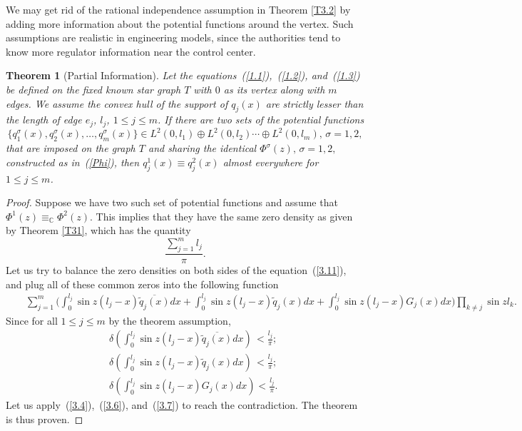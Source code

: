 \documentclass[10pt,a4paper]{article}
\theoremstyle{plain}
\newtheorem{theorem}{Theorem}[section]
\theoremstyle{definition}
\theoremstyle{remark}
\numberwithin{equation}{section}
\begin{document}
We may get rid of the rational independence assumption in Theorem \ref{T3.2} by adding more information about the potential functions around the vertex. Such assumptions are realistic in engineering models, since the authorities tend to know more regulator information near the control center.
\begin{theorem}[Partial Information]
Let the equations~(\ref{1.1}),~(\ref{1.2}), and~(\ref{1.3}) be defined on the fixed known star graph 
$T$ with $0$ as its vertex along with $m$ edges. We assume the convex hull of the support of $q_{j}(x)$ are strictly lesser than the length of edge 
$e_{j}$, $l_{j}$, $1\leq j\leq m$. If there are two sets of the potential functions $$\{q_{1}^{\sigma}(x),q_{2}^{\sigma}(x),\ldots,q_{m}^{\sigma}(x)\}\in L^{2}(0,l_{1})\oplus L^{2}(0,l_{2})\cdots\oplus L^{2}(0,l_{m}),\,\sigma=1,2,$$ that are imposed on the graph $T$ and sharing the identical $\Phi^{\sigma}(z),\,\sigma=1,2,$ constructed as in~(\ref{Phi}), then $q_{j}^{1}(x)\equiv q_{j}^{2}(x)$ almost everywhere for $1\leq j\leq m$.
\end{theorem}
\begin{proof}
Suppose we have two such set of potential functions  and assume that $\Phi^{1}(z)\equiv_{\mathbb{C}}\Phi^{2}(z)$.  This implies that they have the same zero density as given by Theorem \ref{T31}, which has the quantity
 $$\frac{\sum_{j=1}^{m}l_{j}}{\pi}.$$
Let us try to balance the zero densities on both sides of the equation~(\ref{3.11}), and  plug all of these common zeros into the following function
\begin{eqnarray}\nonumber
&&\sum_{j=1}^{m}\Big(\int_{0}^{l_{j}}\sin{z(l_{j}-x)}\overline{\widetilde{q}_{j}(x)}dx+\int_{0}^{l_{j}}\sin{z(l_{j}-x)}\widetilde{q}_{j}(x)dx+\int_{0}^{l_{j}}\sin{z(l_{j}-x)}G_{j}(x)dx\Big) \prod_{k\neq j}\sin{z l_{k}}.
\end{eqnarray}
Since for all $1\leq j\leq m$ by the theorem assumption,
\begin{eqnarray}
&&\delta(\int_{0}^{l_{j}}\sin{z(l_{j}-x)}\overline{\widetilde{q}_{j}(x)}dx)\,<\frac{l_{j}}{\pi};\\
&&\delta(\int_{0}^{l_{j}}\sin{z(l_{j}-x)}\widetilde{q}_{j}(x)dx)\,<\frac{l_{j}}{\pi};\\
&&\delta(\int_{0}^{l_{j}}\sin{z(l_{j}-x)}G_{j}(x)dx)<\frac{l_{j}}{\pi}.
\end{eqnarray}
Let us apply~(\ref{3.4}),~(\ref{3.6}), and~(\ref{3.7}) to reach the contradiction. The theorem is thus proven.

\end{proof}
\end{document}
